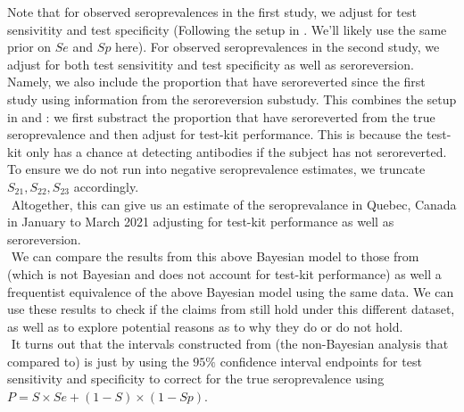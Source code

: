 Note that for observed seroprevalences in the first study, we adjust for test sensivitity and test specificity (Following the setup in \cite{meyer2022adjusting}. We'll likely use the same prior on $Se$ and $Sp$ here). For observed seroprevalences in the second study, we adjust for both test sensivitity and test specificity as well as seroreversion. Namely, we also include the proportion that have seroreverted since the first study using information from the seroreversion substudy. This combines the setup in \cite{lewin2022seroprevalence} and \cite{meyer2022adjusting}: we first substract the proportion that have seroreverted from the true seroprevalence and then adjust for test-kit performance. This is because the test-kit only has a chance at detecting antibodies if the subject has not seroreverted. To ensure we do not run into negative seroprevalence estimates, we truncate $S_{21}, S_{22}, S_{23}$ accordingly.\\
\newline $ $
Altogether, this can give us an estimate of the seroprevalance in Quebec, Canada in January to March 2021 adjusting for test-kit performance as well as seroreversion.\\
\newline $ $
We can compare the results from this above Bayesian model to those from \cite{lewin2022seroprevalence} (which is not Bayesian and does not account for test-kit performance) as well a frequentist equivalence of the above Bayesian model using the same data. We can use these results to check if the claims from \cite{lewin2022seroprevalence} still hold under this different dataset, as well as to explore potential reasons as to why they do or do not hold.\\
\newline $ $
It turns out that the intervals constructed from \cite{rosenberg2020cumulative} (the non-Bayesian analysis that \cite{meyer2022adjusting} compared to) is just by using the $95\%$ confidence interval endpoints for test sensitivity and specificity to correct for the true seroprevalence using $P = S \times Se + (1-S) \times (1-Sp)$.

